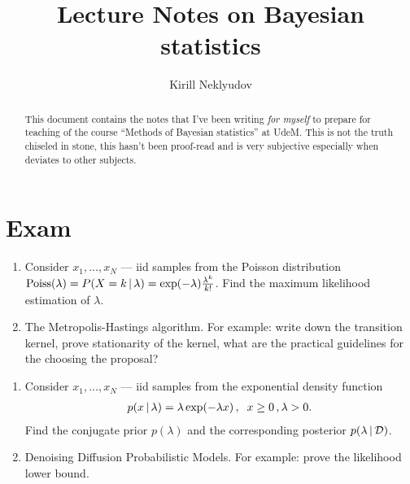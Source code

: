 \documentclass{article}
\title{\huge Lecture Notes on Bayesian statistics}
\author[1]{Kirill Neklyudov}
\begin{document}
\maketitle

\begin{abstract}
    This document contains the notes that I've been writing \textit{for myself} to prepare for teaching of the course ``Methods of Bayesian statistics'' at UdeM. This is not the truth chiseled in stone, this hasn't been proof-read and is very subjective especially when deviates to other subjects.
\end{abstract}

\tableofcontents
\clearpage


\clearpage

\clearpage

\clearpage

\clearpage



\clearpage

\appendix


\clearpage
\section{Exam}

\begin{question}
\begin{enumerate}
    \item Consider $x_1,\ldots,x_N$ --- iid samples from the Poisson distribution $\text{Poiss}(\lambda) = P(X = k\,|\, \lambda) = \exp(-\lambda)\frac{\lambda^k}{k!}$. Find the maximum likelihood estimation of $\lambda$.
    \item The Metropolis-Hastings algorithm. For example: write down the transition kernel, prove stationarity of the kernel, what are the practical guidelines for the choosing the proposal?
\end{enumerate}
\end{question}

\begin{question}
\begin{enumerate}
    \item Consider $x_1,\ldots,x_N$ --- iid samples from the exponential density function
    \begin{align*}
        p(x\,|\, \lambda) = \lambda\exp(-\lambda x)\,, \;\; x \geq 0\,, \lambda > 0.
    \end{align*}
    Find the conjugate prior $p(\lambda)$ and the corresponding posterior $p(\lambda\,|\, \mathcal{D})$.
    \item Denoising Diffusion Probabilistic Models. For example: prove the likelihood lower bound.
\end{enumerate}
\end{question}
\end{document}
